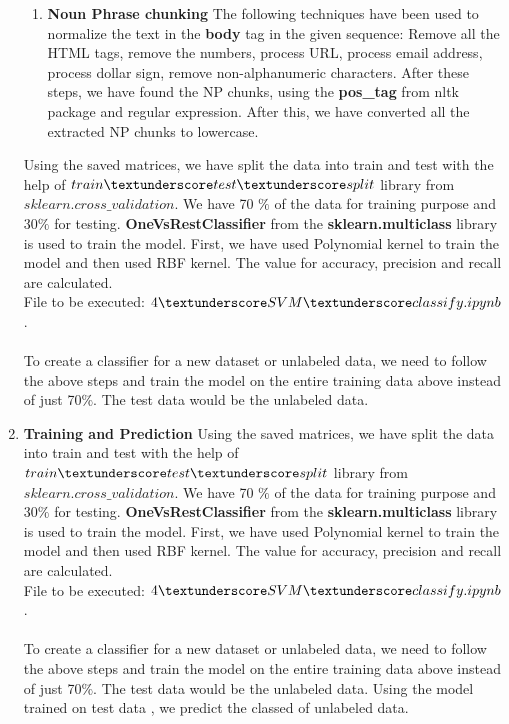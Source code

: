 \documentclass[fleqn,10pt]{SelfArx} %
\begin{document}
\begin{enumerate}
\begin{enumerate}
\item\textbf{Noun Phrase chunking}
The following techniques have been used to normalize the text in the \textbf{body} tag in the given sequence:
Remove all the HTML tags, remove the numbers, process URL, process email address, process dollar sign, remove non-alphanumeric characters. After these steps, we have found the NP chunks, using the \textbf{pos\_tag} from nltk package and regular expression. After this, we have converted all the extracted NP chunks to lowercase.
\end{enumerate}
Using the saved matrices, we have split the data into train and test with the help of $train\textunderscore test\textunderscore split$ library from \\$sklearn.cross\_validation$. We have 70 $\%$ of the data for training purpose and 30$\%$ for testing. \textbf{OneVsRestClassifier} from the \textbf{sklearn.multiclass} library is used to train the model. First, we have used Polynomial kernel to train the model and then used RBF kernel. The value for accuracy, precision and recall are calculated. 
\\File to be executed: $4\textunderscore SVM\textunderscore classify.ipynb$.
\\\\To create a classifier for a new dataset or unlabeled data, we need to follow the above steps and train the model on the entire training data above instead of just 70$\%$. The test data would be the unlabeled data.
\item \textbf{Training and Prediction}
Using the saved matrices, we have split the data into train and test with the help of $train\textunderscore test\textunderscore split$ library from \\$sklearn.cross\_validation$. We have 70 $\%$ of the data for training purpose and 30$\%$ for testing. \textbf{OneVsRestClassifier} from the \textbf{sklearn.multiclass} library is used to train the model. First, we have used Polynomial kernel to train the model and then used RBF kernel. The value for accuracy, precision and recall are calculated. 
\\File to be executed: $4\textunderscore SVM\textunderscore classify.ipynb$.
\\\\To create a classifier for a new dataset or unlabeled data, we need to follow the above steps and train the model on the entire training data above instead of just 70$\%$. The test data would be the unlabeled data. Using the model trained on test data , we predict the classed of unlabeled data.
\end{enumerate}
\end{document}
